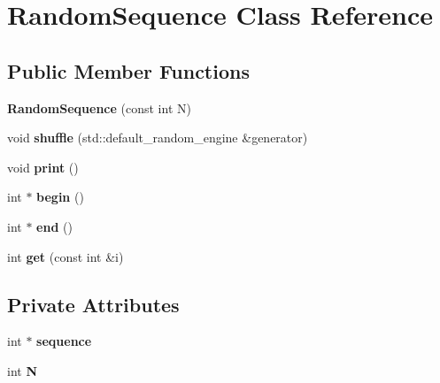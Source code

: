 \hypertarget{classRandomSequence}{}\section{Random\+Sequence Class Reference}
\label{classRandomSequence}
\subsection*{Public Member Functions}
\begin{DoxyCompactItemize}
\item 
{\bfseries Random\+Sequence} (const int N)\hypertarget{classRandomSequence_a010f044bbdf4e8be029ba7b936e5c7ae}{}\label{classRandomSequence_a010f044bbdf4e8be029ba7b936e5c7ae}

\item 
void {\bfseries shuffle} (std\+::default\+\_\+random\+\_\+engine \&generator)\hypertarget{classRandomSequence_ab6ca117e2c7d36bdcf4b808c4c9a4e3e}{}\label{classRandomSequence_ab6ca117e2c7d36bdcf4b808c4c9a4e3e}

\item 
void {\bfseries print} ()\hypertarget{classRandomSequence_acf065adaf2b78987d23187bdd60081f0}{}\label{classRandomSequence_acf065adaf2b78987d23187bdd60081f0}

\item 
int $\ast$ {\bfseries begin} ()\hypertarget{classRandomSequence_ac2483da3051c252afe0fcc0c703774c5}{}\label{classRandomSequence_ac2483da3051c252afe0fcc0c703774c5}

\item 
int $\ast$ {\bfseries end} ()\hypertarget{classRandomSequence_a457062d456d29e8d8acbbe78f3a964db}{}\label{classRandomSequence_a457062d456d29e8d8acbbe78f3a964db}

\item 
int {\bfseries get} (const int \&i)\hypertarget{classRandomSequence_a87bbb74fa6a1b4f7c4e1bd07f011c724}{}\label{classRandomSequence_a87bbb74fa6a1b4f7c4e1bd07f011c724}

\end{DoxyCompactItemize}
\subsection*{Private Attributes}
\begin{DoxyCompactItemize}
\item 
int $\ast$ {\bfseries sequence}\hypertarget{classRandomSequence_ac2abe360115973753daaf9404bcb1b01}{}\label{classRandomSequence_ac2abe360115973753daaf9404bcb1b01}

\item 
int {\bfseries N}\hypertarget{classRandomSequence_ae18913047e907399b76ff6ffb4806c92}{}\label{classRandomSequence_ae18913047e907399b76ff6ffb4806c92}

\end{DoxyCompactItemize}


